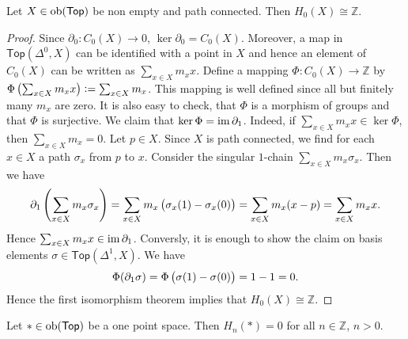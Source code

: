 \begin{proposition}
	Let $X \in \operatorname{ob}(\mathsf{Top})$ be non empty and path connected. Then $H_0(X) \cong \mathbb{Z}$.
\end{proposition}

\begin{proof}
	Since $\partial_0 : C_0(X) \to 0$, $\ker \partial_0 = C_0(X)$. Moreover, a map in $\mathsf{Top}(\Delta^0,X)$ can be identified with a point in $X$ and hence an element of $C_0(X)$ can be written as $\sum_{x \in X}m_x x$. Define a mapping $\Phi : C_0(X) \to \mathbb{Z}$ by $\Phi\del[1]{\sum_{x \in X}m_x x} := \sum_{x \in X}m_x$. This mapping is well defined since all but finitely many $m_x$ are zero. It is also easy to check, that $\Phi$ is a morphism of groups and that $\Phi$ is surjective. We claim that $\ker \Phi = \operatorname{im} \partial_1$. Indeed, if $\sum_{x \in X} m_x x \in \ker \Phi$, then $\sum_{x \in X}m_x = 0$. Let $p \in X$. Since $X$ is path connected, we find for each $x \in X$ a path $\sigma_x$ from $p$ to $x$. Consider the singular $1$-chain $\sum_{x \in X}m_x \sigma_x$. Then we have
	\begin{equation*}
		\partial_1 \del[4]{\sum_{x \in X}m_x \sigma_x} = \sum_{x \in X}m_x \del[1]{\sigma_x(1)- \sigma_x(0)} = \sum_{x \in X}m_x (x - p) = \sum_{x \in X} m_x x.
	\end{equation*}
	Hence $\sum_{x \in X}m_x x \in \operatorname{im} \partial_1$. Conversly, it is enough to show the claim on basis elements $\sigma \in \mathsf{Top}(\Delta^1,X)$. We have
	\begin{equation*}
		\Phi(\partial_1 \sigma) = \Phi\del[1]{\sigma(1) - \sigma(0)} = 1 - 1 = 0.
	\end{equation*}
	Hence the first isomorphism theorem \cite[23]{grillet:abstract_algebra:2007} implies that $H_0(X) \cong \mathbb{Z}$.
\end{proof}

\begin{proposition}
	Let $\ast \in \operatorname{ob}(\mathsf{Top})$ be a one point space. Then $H_n(\ast) = 0$ for all $n \in \mathbb{Z}$, $n > 0$.
\end{proposition}

